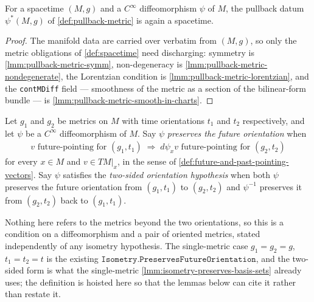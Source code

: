 \begin{theorem}
    \label{thrm:pullback-is-spacetime}
    For a spacetime $(M,g)$ and a $C^\infty$ diffeomorphism $\psi$ of $M$, the pullback datum $\psi^*(M,g)$ of \ref{def:pullback-metric} is again a spacetime.
\end{theorem}
\begin{proof}
    The manifold data are carried over verbatim from $(M,g)$, so only the metric obligations of \ref{def:spacetime} need discharging: symmetry is \ref{lmm:pullback-metric-symm}, non-degeneracy is \ref{lmm:pullback-metric-nondegenerate}, the Lorentzian condition is \ref{lmm:pullback-metric-lorentzian}, and the \texttt{contMDiff} field --- smoothness of the metric as a section of the bilinear-form bundle --- is \ref{lmm:pullback-metric-smooth-in-charts}.
\end{proof}

\begin{definition}
    \label{def:preserves-future-orientation}
    Let $g_1$ and $g_2$ be metrics on $M$ with time orientations $t_1$ and $t_2$ respectively, and let $\psi$ be a $C^\infty$ diffeomorphism of $M$. Say $\psi$ \emph{preserves the future orientation} when
    \begin{align}
        v \text{ future-pointing for } (g_1,t_1) \;\Longrightarrow\; d\psi_x v \text{ future-pointing for } (g_2,t_2)
    \end{align}
    for every $x \in M$ and $v \in TM|_x$, in the sense of \ref{def:future-and-past-pointing-vectors}. Say $\psi$ satisfies the \emph{two-sided orientation hypothesis} when both $\psi$ preserves the future orientation from $(g_1,t_1)$ to $(g_2,t_2)$ and $\psi^{-1}$ preserves it from $(g_2,t_2)$ back to $(g_1,t_1)$.

    Nothing here refers to the metrics beyond the two orientations, so this is a condition on a diffeomorphism and a pair of oriented metrics, stated independently of any isometry hypothesis. The single-metric case $g_1 = g_2 = g$, $t_1 = t_2 = t$ is the existing $\mathtt{Isometry.PreservesFutureOrientation}$, and the two-sided form is what the single-metric \ref{lmm:isometry-preserves-basis-sets} already uses; the definition is hoisted here so that the lemmas below can cite it rather than restate it.
\end{definition}

